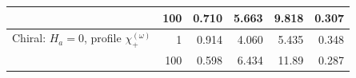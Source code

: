 \begin{table}[H]
\begin{tabular}{@{}lrrrrr@{}}
& 100
& 0.710
& 5.663
& 9.818
& 0.307 \\ %

\midrule

Chiral: $H_a=0$, profile $\chi_+^{(\omega)}$
& 1
& 0.914
& 4.060
& 5.435
& 0.348 \\ %

& 100
& 0.598
& 6.434
& 11.89
& 0.287 \\ %

\bottomrule
\end{tabular}

\endgroup
\end{table}
